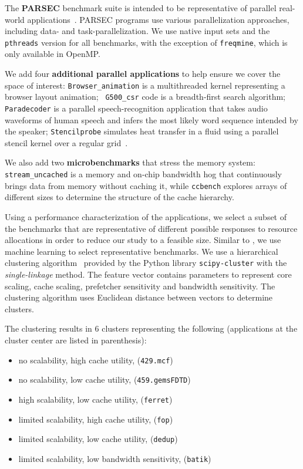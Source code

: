 The \textbf{PARSEC} benchmark suite is intended to be representative
of parallel real-world applications~\cite{parsec}. PARSEC
programs use various parallelization approaches, including data- and
task-parallelization. We use native input sets and the {\tt pthreads} version for all benchmarks, with the exception of
\texttt{freqmine}, which is only available in OpenMP. 

We add four \textbf{additional parallel applications} to help ensure
we cover the space of interest: {\tt Browser\_animation} is a
multithreaded kernel representing a browser layout animation; {\tt
  G500\_csr} code is a breadth-first search algorithm; {\tt Paradecoder} is a parallel
speech-recognition application that takes audio waveforms of human
speech and infers the most likely word sequence intended by the
speaker; {\tt Stencilprobe} simulates heat transfer in a fluid
using a parallel stencil kernel over a regular
grid~\cite{Kamil:Stencilprobe}.

We also add two \textbf{microbenchmarks} that stress the memory
system: {\tt stream\_uncached} is a memory and on-chip bandwidth hog
that continuously brings data from memory without caching it, while
{\tt ccbench} explores arrays of different sizes to determine the
structure of the cache hierarchy.

Using a performance characterization of the applications, we select a subset of the benchmarks that are representative of different possible responses to resource allocations in order to reduce our study to a feasible size.  Similar to \cite{Phansalkar:ISCA2007}, we use machine learning to select representative benchmarks.  We use a
hierarchical clustering algorithm~\cite{Phansalkar:ISCA2007} provided by the Python library \texttt{scipy-cluster} with the \textit{single-linkage} method.  The feature vector contains parameters to represent core scaling, cache scaling, prefetcher sensitivity and bandwidth sensitivity.  The clustering algorithm uses Euclidean distance between vectors to determine clusters.  

The clustering results in 6 clusters representing the following (applications at the cluster center are listed in parenthesis): 
 \begin{itemize}\itemsep0pt \parskip0pt 
\item no scalability, high cache utility, ({\tt 429.mcf})
\item no scalability, low cache utility, ({\tt 459.gems\-FDTD})
\item high scalability, low cache utility, ({\tt ferret})
\item limited scalability, high cache utility, ({\tt fop})
\item limited scalability, low cache utility, ({\tt dedup})
\item limited scalability, low bandwidth sensitivity, ({\tt batik})
\end{itemize}

